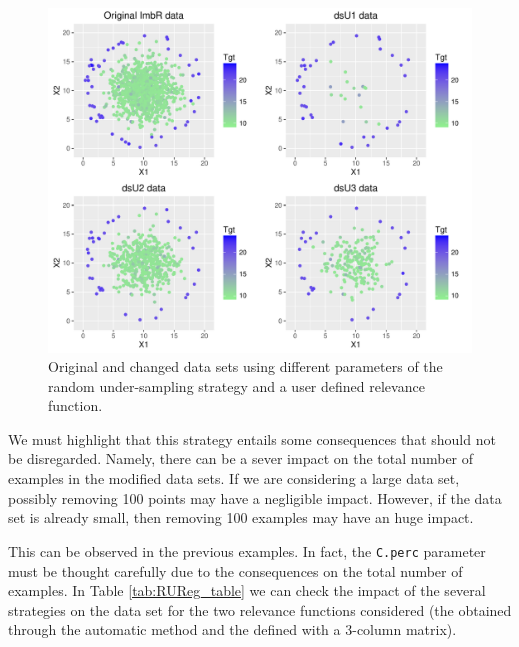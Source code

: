 \documentclass[10pt,a4paper]{article}\usepackage[]{graphicx}\usepackage[]{color}
\makeatletter
\def\maxwidth{ %
  \ifdim\Gin@nat@width>\linewidth
    \linewidth
  \else
    \Gin@nat@width
  \fi
}
\newenvironment{knitrout}{}{} %
\makeatother
\begin{document}
\begin{knitrout}\footnotesize
{}\color{fgcolor}\begin{figure}

{\centering \includegraphics[width=\maxwidth]{figures/UBL-I_u_RU2-1} 

}

\caption[Original and changed data sets using different parameters of the random under-sampling strategy and a user defined relevance function]{Original and changed data sets using different parameters of the random under-sampling strategy and a user defined relevance function.}\label{fig:I_u_RU2}
\end{figure}


\end{knitrout}


We must highlight that this strategy entails some consequences that should not be disregarded. Namely, there can be a sever impact on the total number of examples in the modified data sets. If we are considering a large data set, possibly removing 100 points may have a negligible impact. However, if the data set is already small, then removing 100 examples may have an huge impact. 

This can be observed in the previous examples. In fact, the \texttt{C.perc} parameter must be thought carefully due to the consequences on the total number of examples. In Table \ref{tab:RUReg_table} we can check the impact of the several strategies on the data set for the two relevance functions considered (the obtained through the automatic method and the defined with a 3-column matrix).
\end{document}

